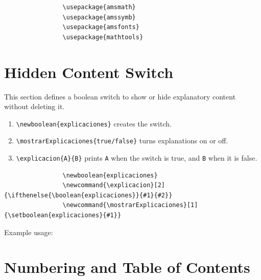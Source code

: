 \begin{minipage}{\anchoPag}
		\begin{mdframed}[style=code]
			\begin{verbatim}
				\usepackage{amsmath}
				\usepackage{amssymb}
				\usepackage{amsfonts}
				\usepackage{mathtools}
			\end{verbatim}
		\end{mdframed}
		
		\section{Hidden Content Switch}\label{sec:hidden}
		
		This section defines a boolean switch to show or hide explanatory content without deleting it.
		
		\begin{enumerate}
			\item \texttt{\textbackslash newboolean\{explicaciones\}} creates the switch.
			\item \texttt{\textbackslash mostrarExplicaciones\{true/false\}} turns explanations on or off.
			\item \texttt{\textbackslash explicacion\{A\}\{B\}} prints \texttt{A} when the switch is true, and \texttt{B} when it is false.
		\end{enumerate}
		
		\begin{mdframed}[style=code]
			\begin{verbatim}
				\newboolean{explicaciones}
				\newcommand{\explicacion}[2]{\ifthenelse{\boolean{explicaciones}}{#1}{#2}}
				\newcommand{\mostrarExplicaciones}[1]{\setboolean{explicaciones}{#1}}
			\end{verbatim}
		\end{mdframed}
		
		\begin{mdframed}[style=estiloGeneral]
			Example usage:
			
			
		\end{mdframed}
		
		\section{Numbering and Table of Contents}\label{sec:numbering}
		

\end{minipage}
